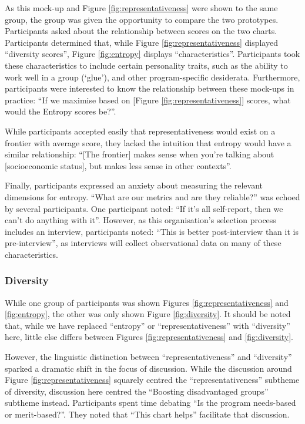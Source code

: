 As this mock-up and Figure \ref{fig:representativeness} were shown to the same group, the group was given the opportunity to compare the two prototypes. Participants asked about the relationship between scores on the two charts. Participants determined that, while Figure \ref{fig:representativeness} displayed ``diversity scores'', Figure \ref{fig:entropy} displays ``characteristics''. Participants took these characteristics to include certain personality traits, such as the ability to work well in a group (`glue'), and other program-specific desiderata. Furthermore, participants were interested to know the relationship between these mock-ups in practice: ``If we maximise based on [Figure \ref{fig:representativeness}] scores, what would the Entropy scores be?''.

While participants accepted easily that representativeness would exist on a frontier with average score, they lacked the intuition that entropy would have a similar relationship: ``[The frontier] makes sense when you're talking about [socioeconomic status], but makes less sense in other contexts''.

Finally, participants expressed an anxiety about measuring the relevant dimensions for entropy. ``What are our metrics and are they reliable?'' was echoed by several participants. One participant noted: ``If it's all self-report, then we can't do anything with it''. However, as this organisation's selection process includes an interview, participants noted: ``This is better post-interview than it is pre-interview'', as interviews will collect observational data on many of these characteristics. 

\subsubsection{Diversity}
While one group of participants was shown Figures \ref{fig:representativeness} and \ref{fig:entropy}, the other was only shown Figure \ref{fig:diversity}. It should be noted that, while we have replaced ``entropy'' or ``representativeness'' with ``diversity'' here, little else differs between Figures \ref{fig:representativeness} and \ref{fig:diversity}. 

However, the linguistic distinction between ``representativeness'' and ``diversity'' sparked a dramatic shift in the focus of discussion. While the discussion around Figure \ref{fig:representativeness} squarely centred the ``representativeness'' subtheme of diversity, discussion here centred the ``Boosting disadvantaged groups'' subtheme instead. Participants spent time debating ``Is the program needs-based or merit-based?''. They noted  that ``This chart helps'' facilitate that discussion.

